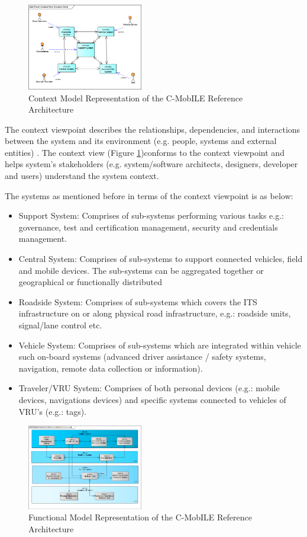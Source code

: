 \documentclass[conference]{IEEEtran}
\begin{document}
\begin{figure}[ht!]
	\centering
	\includegraphics[width=0.45\textwidth]{context}
	\caption{Context Model Representation of the C-MobILE Reference Architecture}
	\label{fig:contextviewpoint}
	\centering
\end{figure}
The context viewpoint describes the relationships, dependencies, and interactions between the system and its environment (e.g. people,
systems and external entities) \cite{sysml}. The context view (Figure \ref{fig:contextviewpoint})conforms to the context viewpoint and helps system’s stakeholders (e.g. system/software architects, designers, developer and users) understand the system context.

The systems as mentioned before in terms of the context viewpoint is as below:

\begin{itemize}
	\item Support System: Comprises of sub-systems performing various tasks e.g.: governance, test and certification management, security and credentials management.
	\item Central System: Comprises of sub-systems to support connected vehicles, field and mobile devices. The sub-systems can be aggregated together or geographical or functionally distributed
	\item Roadside System: Comprises of sub-systems which covers the ITS infrastructure on or along physical road infrastructure, e.g.: roadside units, signal/lane control etc.
	\item Vehicle System: Comprises of sub-systems which are integrated within vehicle such on-board systems (advanced driver assistance / safety systems, navigation, remote data collection or information).
	\item Traveler/VRU System: Comprises of both personal devices (e.g.: mobile devices, navigations devices) and specific systems connected to vehicles of VRU’s (e.g.: tags).
\end{itemize}

\begin{figure}[ht!]
	\centering
	\includegraphics[width=0.45\textwidth]{functional}
	\caption{Functional Model Representation of the C-MobILE Reference Architecture}
	\label{fig:functional}
	\centering
\end{figure}
\end{document}

